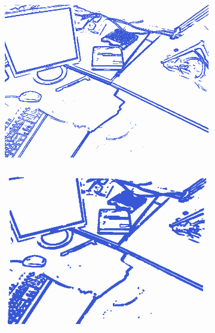\begin{figure}[H]
\begin{center}
\begin{subfigure}[b]{0.3\textwidth}
\includegraphics[scale=0.2]{images/borders_steps1.png}
\caption{}
\end{subfigure}
\begin{subfigure}[b]{0.3\textwidth}
\includegraphics[scale=0.2]{images/borders_steps2.png}
\caption{}
\end{subfigure}
\begin{subfigure}[b]{0.3\textwidth}

\end{subfigure}
\end{center}
\end{figure}
